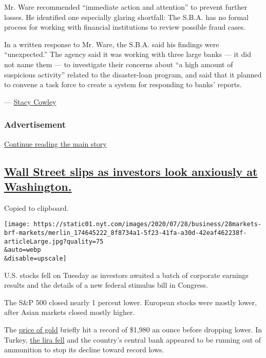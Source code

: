 Mr. Ware recommended ``immediate action and attention'' to prevent
further losses. He identified one especially glaring shortfall: The
S.B.A. has no formal process for working with financial institutions to
review possible fraud cases.

In a written response to Mr. Ware, the S.B.A. said his findings were
``unexpected.'' The agency said it was working with three large banks
--- it did not name them --- to investigate their concerns about ``a
high amount of suspicious activity'' related to the disaster-loan
program, and said that it planned to convene a task force to create a
system for responding to banks' reports.

--- \href{https://www.nytimes.com/by/stacy-cowley}{Stacy Cowley}

\hypertarget{advertisement-1}{%
\subsubsection{Advertisement}\label{advertisement-1}}

\protect\hyperlink{after-dfp-ad-mid2}{Continue reading the main story}

\hypertarget{wall-street-slips-as-investors-look-anxiously-at-washington}{%
\subsection{\texorpdfstring{\protect\hyperlink{wall-street-slips-as-investors-look-anxiously-at-washington}{Wall
Street slips as investors look anxiously at
Washington.}}{Wall Street slips as investors look anxiously at Washington.}}\label{wall-street-slips-as-investors-look-anxiously-at-washington}}

Copied to clipboard.

\texttt{[image: https://static01.nyt.com/images/2020/07/28/business/28markets-brf-markets/merlin\_174645222\_8f8734a1-5f23-41fa-a30d-42eaf462238f-articleLarge.jpg?quality=75\\\&auto=webp\\\&disable=upscale]}

U.S. stocks fell on Tuesday as investors awaited a batch of corporate
earnings results and the details of a new federal stimulus bill in
Congress.

The S\&P 500 closed nearly 1 percent lower. European stocks were mostly
lower, after Asian markets closed mostly higher.

The
\href{https://www.nytimes.com/2020/07/27/business/gold-prices-record-high.html}{price
of gold} briefly hit a record of \$1,980 an ounce before dropping lower.
In Turkey,
\href{https://www.nytimes.com/live/2020/07/28/business/stock-market-today-coronavirus/turkey-faces-currency-crisis-as-lira-nears-record-lows}{the
lira fell} and the country's central bank appeared to be running out of
ammunition to stop its decline toward record lows.

